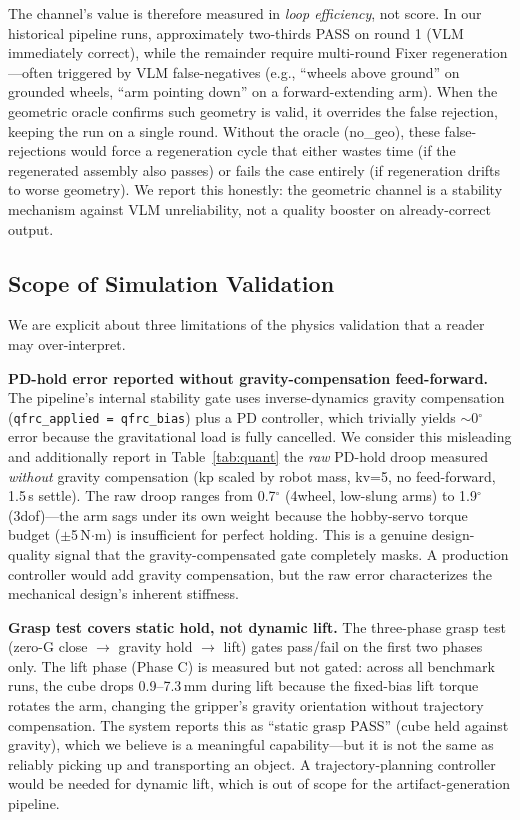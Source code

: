 \documentclass[conference]{IEEEtran}
\begin{document}
The channel's value is therefore measured in \emph{loop efficiency}, not score. In our historical pipeline runs, approximately two-thirds PASS on round 1 (VLM immediately correct), while the remainder require multi-round Fixer regeneration---often triggered by VLM false-negatives (e.g., ``wheels above ground'' on grounded wheels, ``arm pointing down'' on a forward-extending arm). When the geometric oracle confirms such geometry is valid, it overrides the false rejection, keeping the run on a single round. Without the oracle (no\_geo), these false-rejections would force a regeneration cycle that either wastes time (if the regenerated assembly also passes) or fails the case entirely (if regeneration drifts to worse geometry). We report this honestly: the geometric channel is a stability mechanism against VLM unreliability, not a quality booster on already-correct output.

\subsection{Scope of Simulation Validation}
\label{sec:sim-limits}
We are explicit about three limitations of the physics validation that a reader may over-interpret.

\textbf{PD-hold error reported without gravity-compensation feed-forward.} The pipeline's internal stability gate uses inverse-dynamics gravity compensation (\texttt{qfrc\_applied = qfrc\_bias}) plus a PD controller, which trivially yields $\sim$0$^\circ$ error because the gravitational load is fully cancelled. We consider this misleading and additionally report in Table~\ref{tab:quant} the \emph{raw} PD-hold droop measured \emph{without} gravity compensation (kp scaled by robot mass, kv=5, no feed-forward, 1.5\,s settle). The raw droop ranges from 0.7$^\circ$ (4wheel, low-slung arms) to 1.9$^\circ$ (3dof)---the arm sags under its own weight because the hobby-servo torque budget ($\pm$5\,N$\cdot$m) is insufficient for perfect holding. This is a genuine design-quality signal that the gravity-compensated gate completely masks. A production controller would add gravity compensation, but the raw error characterizes the mechanical design's inherent stiffness.

\textbf{Grasp test covers static hold, not dynamic lift.} The three-phase grasp test (zero-G close $\to$ gravity hold $\to$ lift) gates pass/fail on the first two phases only. The lift phase (Phase C) is measured but not gated: across all benchmark runs, the cube drops 0.9--7.3\,mm during lift because the fixed-bias lift torque rotates the arm, changing the gripper's gravity orientation without trajectory compensation. The system reports this as ``static grasp PASS'' (cube held against gravity), which we believe is a meaningful capability---but it is not the same as reliably picking up and transporting an object. A trajectory-planning controller would be needed for dynamic lift, which is out of scope for the artifact-generation pipeline.
\end{document}
